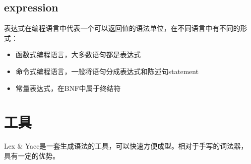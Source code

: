 \subsection{expression}
表达式在编程语言中代表一个可以返回值的语法单位，在不同语言中有不同的形式：
\begin{itemize}
    \item {函数式编程语言，大多数语句都是表达式}
    \item {命令式编程语言，一般将语句分成表达式和陈述句statement}
    \item {常量表达式，在BNF中属于终结符}
\end{itemize}

\section{工具}
Lex \& Yacc是一套生成语法的工具，可以快速方便成型。相对于手写的词法器，具有一定的优势。
